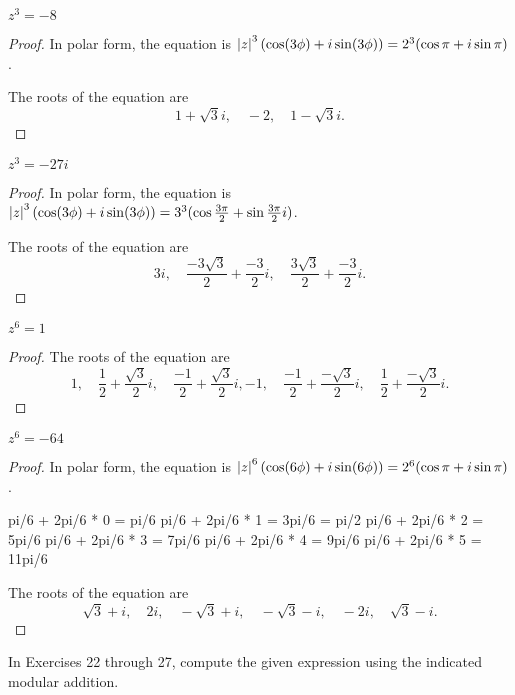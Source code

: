 \begin{exercise}
    $z^{3} = -8$
\end{exercise}

\begin{proof}
    In polar form, the equation is $\left\vert{z}\right\vert^{3}(\cos (3\phi) + i\sin (3\phi)) = 2^{3}(\cos\pi + i\sin\pi)$.

    The roots of the equation are
    \[
        1 + \sqrt{3}i,\quad -2,\quad 1 - \sqrt{3}i.
    \]
\end{proof}

\begin{exercise}
    $z^{3} = -27i$
\end{exercise}

\begin{proof}
    In polar form, the equation is $\left\vert{z}\right\vert^{3}(\cos (3\phi) + i\sin (3\phi)) = 3^{3}(\cos\frac{3\pi}{2} + \sin\frac{3\pi}{2}i)$.

    The roots of the equation are
    \[
        3i,\quad \frac{-3\sqrt{3}}{2} + \frac{-3}{2}i,\quad\frac{3\sqrt{3}}{2} + \frac{-3}{2}i.
    \]
\end{proof}

\begin{exercise}
    $z^{6} = 1$
\end{exercise}

\begin{proof}
    The roots of the equation are
    \[
        1,\quad \frac{1}{2} + \frac{\sqrt{3}}{2}i,\quad \frac{-1}{2} + \frac{\sqrt{3}}{2}i, -1,\quad \frac{-1}{2} + \frac{-\sqrt{3}}{2}i,\quad \frac{1}{2} + \frac{-\sqrt{3}}{2}i.
    \]
\end{proof}

\begin{exercise}
    $z^{6} = -64$
\end{exercise}

\begin{proof}
    In polar form, the equation is $\left\vert{z}\right\vert^{6}(\cos(6\phi) + i\sin(6\phi)) = 2^{6}(\cos\pi + i\sin\pi)$.

    pi/6 + 2pi/6 * 0 = pi/6
    pi/6 + 2pi/6 * 1 = 3pi/6 = pi/2
    pi/6 + 2pi/6 * 2 = 5pi/6
    pi/6 + 2pi/6 * 3 = 7pi/6
    pi/6 + 2pi/6 * 4 = 9pi/6
    pi/6 + 2pi/6 * 5 = 11pi/6

    The roots of the equation are
    \[
        \sqrt{3} + i,\quad 2i,\quad -\sqrt{3} + i,\quad -\sqrt{3} - i,\quad -2i,\quad \sqrt{3} - i.
    \]
\end{proof}

In Exercises 22 through 27, compute the given expression using the indicated modular addition.

